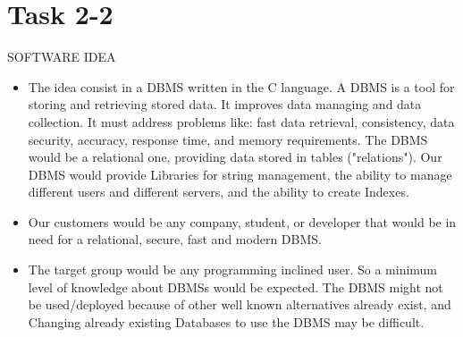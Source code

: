 \chapter{Task 2-2} %
{\LARGE SOFTWARE IDEA}
\begin{itemize}
	\item The idea consist in a DBMS written in the C language. A DBMS is a tool for storing and retrieving stored data. It improves data managing and data collection. It must address problems like: fast data retrieval, consistency, data security, accuracy, response time, and memory requirements. The DBMS would be a relational one, providing data stored in tables ("relations"). Our DBMS would provide Libraries for string management, the ability to manage different users and different servers, and the ability to create Indexes.
	 \item Our customers would be any company, student, or developer that would be in need for a relational, secure, fast and modern DBMS. 
	\item The target group would be any programming inclined user. So a minimum level of knowledge about DBMSs would be expected. The DBMS might not be used/deployed because of other well known alternatives already exist, and Changing already existing Databases to use the DBMS may be difficult.
\end{itemize}